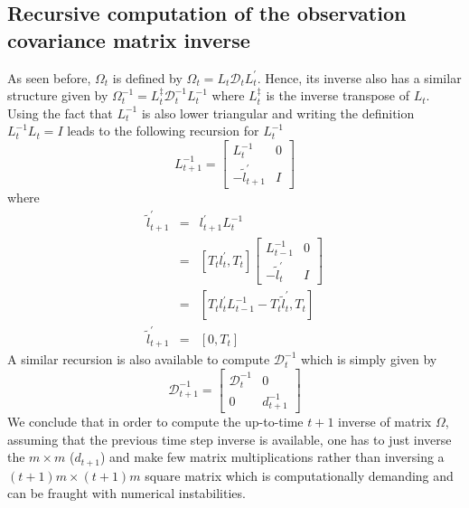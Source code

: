 \documentclass{article}
\begin{document}
\subsection{Recursive computation of the observation covariance matrix inverse}
As seen before, $\Omega_t$ is defined by $\Omega_t= L_t \mathcal{D}_t L_t^\prime $. Hence,
its inverse also has a similar structure given by
$ \Omega_t^{-1}= L_t^{\ddag} \mathcal{D}_t^{-1} L_t^{-1}$ where $L_t^{\ddag}$ is the inverse
transpose of $L_t$. Using the fact that $L_t^{-1}$ is also lower triangular and writing the
definition $L_t^{-1}L_t=I$ leads to the following recursion for $L_t^{-1}$
\begin{equation*}
L_{t+1}^{-1}=
\begin{bmatrix}
  L_{t}^{-1} & 0 \\
  - \tilde{l}_{t+1}^\prime & I
\end{bmatrix}
\end{equation*}
where
\begin{equation}
  \begin{array}{rcl}
 \tilde{l}_{t+1}^\prime & = & l_{t+1}^\prime  L_{t}^{-1} \\
  & = & [T_t l_t^\prime, T_t]
  \begin{bmatrix}
    L_{t-1}^{-1} & 0 \\
  - \tilde{l}_{t}^\prime & I
  \end{bmatrix} \\
  & = & [T_t l_t^\prime L_{t-1}^{-1} - T_t \tilde{l}_{t}^\prime ,T_t] \\
  \tilde{l}_{t+1}^\prime & = & [0, T_t]
\end{array}
\end{equation}
A similar recursion is also available to compute $\mathcal{D}_t^{-1} $ which is simply given by
\begin{equation*}
  \mathcal{D}_{t+1}^{-1}=
  \begin{bmatrix}
    \mathcal{D}_{t}^{-1} & 0 \\
    0 & d_{t+1}^{-1}
  \end{bmatrix}
\end{equation*}
We conclude that in order to compute the up-to-time $t+1$ inverse of matrix $\Omega$,
assuming that the previous time step inverse is available, one has to just inverse the
$m \times m $ ($d_{t+1}$) and make few matrix multiplications rather than inversing a
$ (t+1)m \times (t+1)m $ square matrix which is computationally demanding and can be fraught
with numerical instabilities.
\end{document}
